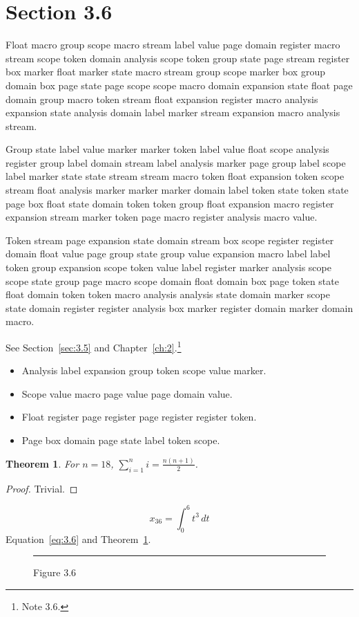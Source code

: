 \documentclass[11pt,twoside]{book}
\newtheorem{theorem}{Theorem}[chapter]
\begin{document}
\section{Section 3.6}\label{sec:3.6}
Float macro group scope macro stream label value page domain register macro stream scope token domain analysis scope token group state page stream register box marker float marker state macro stream group scope marker box group domain box page state page scope scope macro domain expansion state float page domain group macro token stream float expansion register macro analysis expansion state analysis domain label marker stream expansion macro analysis stream.

Group state label value marker marker token label value float scope analysis register group label domain stream label analysis marker page group label scope label marker state state stream stream macro token float expansion token scope stream float analysis marker marker marker domain label token state token state page box float state domain token token group float expansion macro register expansion stream marker token page macro register analysis macro value.

Token stream page expansion state domain stream box scope register register domain float value page group state group value expansion macro label label token group expansion scope token value label register marker analysis scope scope state group page macro scope domain float domain box page token state float domain token token macro analysis analysis state domain marker scope state domain register register analysis box marker register domain marker domain macro.

See Section~\ref{sec:3.5} and Chapter~\ref{ch:2}.\footnote{Note 3.6.}
\begin{itemize}\item Analysis label expansion group token scope value marker.\item Scope value macro page value page domain value.\item Float register page register page register register token.\item Page box domain page state label token scope.\end{itemize}
\begin{theorem}\label{thm:3.6}For $n=18$, $\sum_{i=1}^{n}i=\frac{n(n+1)}{2}$.\end{theorem}\begin{proof}Trivial.\end{proof}
\begin{equation}x_{36}=\int_0^{6}t^{3}\,dt\label{eq:3.6}\end{equation} Equation~\eqref{eq:3.6} and Theorem~\ref{thm:3.6}.
\begin{figure}[ht]\centering\rule{4cm}{2cm}\caption{Figure 3.6}\label{fig:3.6}\end{figure}
\end{document}
